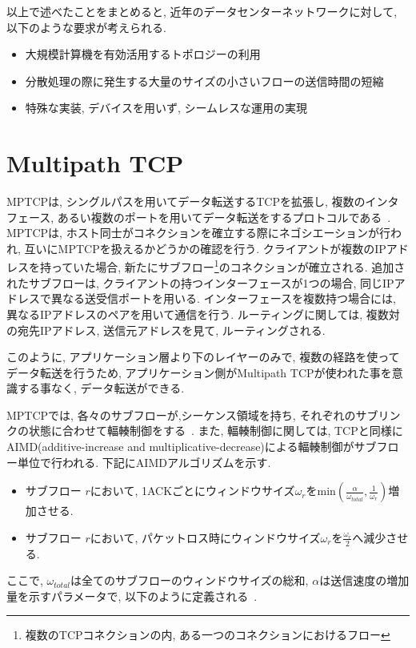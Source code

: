 \documentclass[technicalreport]{ieicej}
\begin{document}
以上で述べたことをまとめると, 近年のデータセンターネットワークに対して, 以下のような要求が考えられる.
\begin{itemize}
  \item 大規模計算機を有効活用するトポロジーの利用
  \item 分散処理の際に発生する大量のサイズの小さいフローの送信時間の短縮
  \item 特殊な実装, デバイスを用いず, シームレスな運用の実現
\end{itemize}

\section{Multipath TCP}
\label{sec:mptcp}
MPTCPは, シングルパスを用いてデータ転送するTCPを拡張し, 複数のインタフェース,
あるい複数のポートを用いてデータ転送をするプロトコルである~\cite{mptcp}.
MPTCPは, ホスト同士がコネクションを確立する際にネゴシエーションが行われ, 互いにMPTCPを扱えるかどうかの確認を行う.
クライアントが複数のIPアドレスを持っていた場合, 新たにサブフロー\footnote{複数のTCPコネクションの内,
ある一つのコネクションにおけるフロー}のコネクションが確立される.
追加されたサブフローは, クライアントの持つインターフェースが1つの場合, 同じIPアドレスで異なる送受信ポートを用いる.
インターフェースを複数持つ場合には, 異なるIPアドレスのペアを用いて通信を行う.
ルーティングに関しては, 複数対の宛先IPアドレス, 送信元アドレスを見て, ルーティングされる.

このように, アプリケーション層より下のレイヤーのみで, 複数の経路を使ってデータ転送を行うため, アプリケーション側がMultipath
TCPが使われた事を意識する事なく, データ転送ができる.

MPTCPでは, 各々のサブフローが,シーケンス領域を持ち, それぞれのサブリンクの状態に合わせて輻輳制御をする~\cite{cong}.
また, 輻輳制御に関しては, TCPと同様にAIMD(additive-increase and
multiplicative-decrease)による輻輳制御がサブフロー単位で行われる.
下記にAIMDアルゴリズムを示す.

\begin{itemize}
\item サブフロー $r$において,
1ACKごとにウィンドウサイズ$\omega_{r}$をmin$(\frac{\alpha}{\omega_{total}},
\frac{1}{\omega_r})$増加させる.
\item サブフロー $r$において, パケットロス時にウィンドウサイズ$\omega_r$を$\frac{\omega_r}{2}$へ減少させる.
\end{itemize}
ここで, $\omega_{total}$は全てのサブフローのウィンドウサイズの総和, $\alpha$は送信速度の増加量を示すパラメータで,
以下のように定義される~\cite{cong}.
\end{document}
